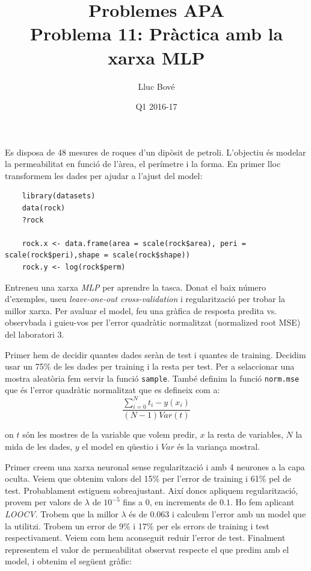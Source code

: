 \documentclass[a4paper]{article}
\title{Problemes APA \\ Problema 11: Pràctica amb la xarxa MLP}
\author{Lluc Bové}
\date{Q1 2016-17}
\begin{document}
\maketitle

Es disposa de 48 mesures de roques d'un dipòsit de petroli. L'objectiu és modelar la permeabilitat en funció de l'àrea, el perímetre i la forma. En primer lloc transformem les dades per ajudar a l'ajust del model:

\begin{lstlisting}
	library(datasets)
	data(rock)
	?rock
	
	rock.x <- data.frame(area = scale(rock$area), peri = scale(rock$peri),shape = scale(rock$shape))
	rock.y <- log(rock$perm)
\end{lstlisting}

Entreneu una xarxa \textit{MLP} per aprendre la tasca. Donat el baix número d'exemples, useu \textit{leave-one-out cross-validation} i regularització per trobar la millor xarxa. Per avaluar el model, feu una gràfica de resposta predita vs. observbada i guieu-vos per l'error quadràtic normalitzat (normalized root MSE) del laboratori 3.

Primer hem de decidir quantes dades seràn de test i quantes de training. Decidim usar un 75\% de les dades per training i la resta per test. Per a selaccionar una mostra aleatòria fem servir la funció \lstinline|sample|. També definim la funció \lstinline|norm.mse| que és l'error quadràtic normalitzat que es defineix com a: $$\frac{\sum_{i = 0}^{N}t_i - y(x_i)}{(N - 1) Var(t)}$$ 

on $t$ són les mostres de la variable que volem predir, $x$ la resta de variables, $N$ la mida de les dades, $y$ el model en qüestio i $Var$ és la variança mostral.

Primer creem una xarxa neuronal sense regularització i amb 4 neurones a la capa oculta. Veiem que obtenim valors del 15\% per l'error de training i 61\% pel de test. Probablament estiguem sobreajustant. Així doncs apliquem regularització, provem per valors de $\lambda$ de $10^{-5}$ fins a 0, en increments de $0.1$. Ho fem aplicant \textit{LOOCV}. Trobem que la millor $\lambda$ és de $0.063$ i calculem l'error amb un model que la utilitzi. Trobem un error de 9\% i 17\% per els errors de training i test respectivament. Veiem com hem aconseguit reduir l'error de test. Finalment representem el valor de permeabilitat observat respecte el que predim amb el model, i obtenim el següent gràfic:
\end{document}
